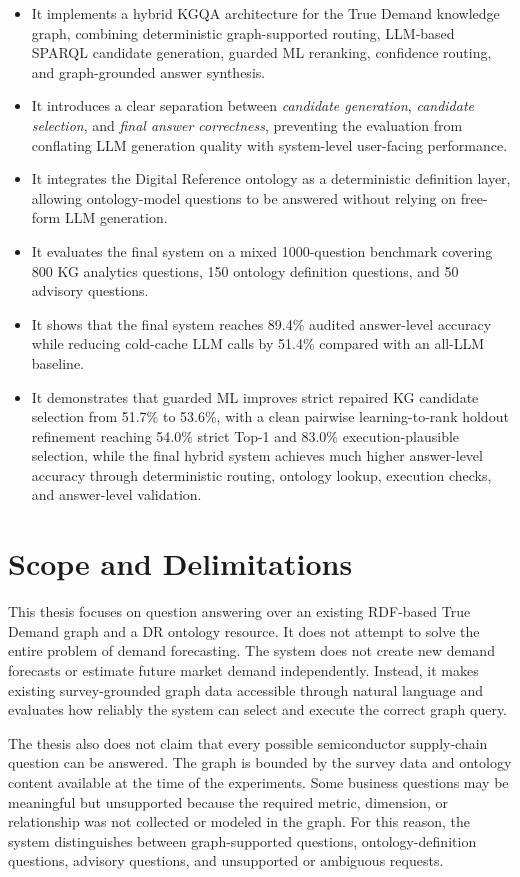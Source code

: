 \documentclass[
  12pt,
  english,
  oneside]{report}
\begin{document}
\begin{itemize}
    \item It implements a hybrid KGQA architecture for the True Demand knowledge graph, combining deterministic graph-supported routing, LLM-based SPARQL candidate generation, guarded ML reranking, confidence routing, and graph-grounded answer synthesis.
    \item It introduces a clear separation between \emph{candidate generation}, \emph{candidate selection}, and \emph{final answer correctness}, preventing the evaluation from conflating LLM generation quality with system-level user-facing performance.
    \item It integrates the Digital Reference ontology as a deterministic definition layer, allowing ontology-model questions to be answered without relying on free-form LLM generation.
    \item It evaluates the final system on a mixed 1000-question benchmark covering 800 KG analytics questions, 150 ontology definition questions, and 50 advisory questions.
    \item It shows that the final system reaches 89.4\% audited answer-level accuracy while reducing cold-cache LLM calls by 51.4\% compared with an all-LLM baseline.
    \item It demonstrates that guarded ML improves strict repaired KG candidate selection from 51.7\% to 53.6\%, with a clean pairwise learning-to-rank holdout refinement reaching 54.0\% strict Top-1 and 83.0\% execution-plausible selection, while the final hybrid system achieves much higher answer-level accuracy through deterministic routing, ontology lookup, execution checks, and answer-level validation.
\end{itemize}

\section{Scope and Delimitations}

This thesis focuses on question answering over an existing RDF-based True Demand graph and a DR ontology resource. It does not attempt to solve the entire problem of demand forecasting. The system does not create new demand forecasts or estimate future market demand independently. Instead, it makes existing survey-grounded graph data accessible through natural language and evaluates how reliably the system can select and execute the correct graph query.

The thesis also does not claim that every possible semiconductor supply-chain question can be answered. The graph is bounded by the survey data and ontology content available at the time of the experiments. Some business questions may be meaningful but unsupported because the required metric, dimension, or relationship was not collected or modeled in the graph. For this reason, the system distinguishes between graph-supported questions, ontology-definition questions, advisory questions, and unsupported or ambiguous requests.
\end{document}
